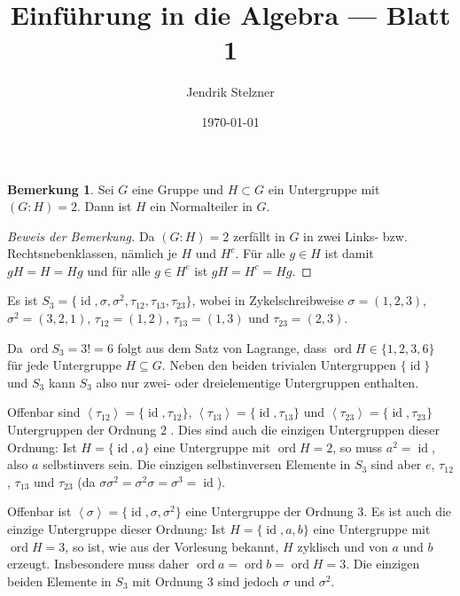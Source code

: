 \documentclass[a4paper,10pt]{article}
\title{Einführung in die Algebra — Blatt 1}
\author{Jendrik Stelzner}
\date{\today}
\theoremstyle{definition}
\newtheorem*{bem}{Bemerkung}
\newcommand{\id}{\operatorname{id}}
\newcommand{\ord}{\operatorname{ord}}
\newcommand{\gen}[1]{\left\langle#1\right\rangle}
\begin{document}
\maketitle





\section{}

\begin{bem}
 Sei $G$ eine Gruppe und $H \subset G$ ein Untergruppe mit $(G : H) = 2$. Dann ist $H$ ein Normalteiler in $G$.
\end{bem}
\begin{proof}[Beweis der Bemerkung]
 Da $(G : H) = 2$ zerfällt in $G$ in zwei Links- bzw. Rechtsnebenklassen, nämlich je $H$ und $H^c$. Für alle $g \in H$ ist damit $gH = H = Hg$ und für alle $g \in H^c$ ist $gH = H^c = Hg$.
\end{proof}

Es ist $S_3 = \{\id, \sigma, \sigma^2, \tau_{12}, \tau_{13}, \tau_{23} \}$, wobei in Zykelschreibweise $\sigma = (1,2,3)$, $\sigma^2 = (3,2,1)$, $\tau_{12} = (1,2)$, $\tau_{13} = (1,3)$ und $\tau_{23} = (2,3)$.

Da $\ord S_3 = 3! = 6$ folgt aus dem Satz von Lagrange, dass $\ord H \in \{1,2,3,6\}$ für jede Untergruppe $H \subseteq G$. Neben den beiden trivialen Untergruppen $\{\id\}$ und $S_3$ kann $S_3$ also nur zwei- oder dreielementige Untergruppen enthalten.

Offenbar sind $\gen{\tau_{12}} = \{\id,\tau_{12}\}$, $\gen{\tau_{13}} = \{\id, \tau_{13}\}$ und $\gen{\tau_{23}} = \{\id, \tau_{23}\}$ Untergruppen der Ordnung $2$ . Dies sind auch die einzigen Untergruppen dieser Ordnung: Ist $H = \{\id, a\}$ eine Untergruppe mit $\ord H = 2$, so muss $a^2 = \id$, also $a$ selbstinvers sein. Die einzigen selbstinversen Elemente in $S_3$ sind aber $e$, $\tau_{12}$, $\tau_{13}$ und $\tau_{23}$ (da $\sigma \sigma^2 = \sigma^2 \sigma = \sigma^3 = \id$).

Offenbar ist $\gen{\sigma} = \{\id, \sigma, \sigma^2\}$ eine Untergruppe der Ordnung $3$. Es ist auch die einzige Untergruppe dieser Ordnung: Ist $H = \{\id, a, b\}$ eine Untergruppe mit $\ord H = 3$, so ist, wie aus der Vorlesung bekannt, $H$ zyklisch und von $a$ und $b$ erzeugt. Insbesondere muss daher $\ord a = \ord b = \ord H = 3$. Die einzigen beiden Elemente in $S_3$ mit Ordnung $3$ sind jedoch $\sigma$ und $\sigma^2$.
\end{document}
